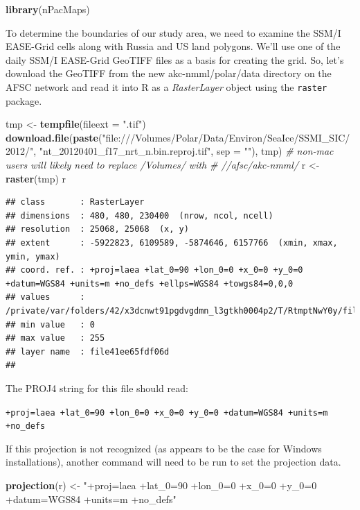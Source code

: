 \documentclass[]{article}
\newenvironment{Shaded}{}{}
\newcommand{\KeywordTok}[1]{\textcolor[rgb]{0.00,0.44,0.13}{\textbf{{#1}}}}
\newcommand{\DataTypeTok}[1]{\textcolor[rgb]{0.56,0.13,0.00}{{#1}}}
\newcommand{\StringTok}[1]{\textcolor[rgb]{0.25,0.44,0.63}{{#1}}}
\newcommand{\CommentTok}[1]{\textcolor[rgb]{0.38,0.63,0.69}{\textit{{#1}}}}
\newcommand{\NormalTok}[1]{{#1}}
\begin{document}
\begin{Shaded}
\begin{Highlighting}[]
\KeywordTok{library}\NormalTok{(nPacMaps)}
\end{Highlighting}
\end{Shaded}
To determine the boundaries of our study area, we need to examine the
SSM/I EASE-Grid cells along with Russia and US land polygons. We'll use
one of the daily SSM/I EASE-Grid GeoTIFF files as a basis for creating
the grid. So, let's download the GeoTIFF from the new
akc-nmml/polar/data directory on the AFSC network and read it into R as
a \emph{RasterLayer} object using the \texttt{raster} package.

\begin{Shaded}
\begin{Highlighting}[]
\NormalTok{tmp <- }\KeywordTok{tempfile}\NormalTok{(}\DataTypeTok{fileext =} \StringTok{".tif"}\NormalTok{)}
\KeywordTok{download.file}\NormalTok{(}\KeywordTok{paste}\NormalTok{(}\StringTok{"file:///Volumes/Polar/Data/Environ/SeaIce/SSMI_SIC/2012/"}\NormalTok{, }
    \StringTok{"nt_20120401_f17_nrt_n.bin.reproj.tif"}\NormalTok{, }\DataTypeTok{sep =} \StringTok{""}\NormalTok{), tmp)}
\CommentTok{# non-mac users will likely need to replace /Volumes/ with}
\CommentTok{# //afsc/akc-nmml/}
\NormalTok{r <- }\KeywordTok{raster}\NormalTok{(tmp)}
\NormalTok{r}
\end{Highlighting}
\end{Shaded}
\begin{verbatim}
## class       : RasterLayer 
## dimensions  : 480, 480, 230400  (nrow, ncol, ncell)
## resolution  : 25068, 25068  (x, y)
## extent      : -5922823, 6109589, -5874646, 6157766  (xmin, xmax, ymin, ymax)
## coord. ref. : +proj=laea +lat_0=90 +lon_0=0 +x_0=0 +y_0=0 +datum=WGS84 +units=m +no_defs +ellps=WGS84 +towgs84=0,0,0 
## values      : /private/var/folders/42/x3dcnwt91pgdvgdmn_l3gtkh0004p2/T/RtmptNwY0y/file41ee65fdf06d.tif 
## min value   : 0 
## max value   : 255 
## layer name  : file41ee65fdf06d 
## 
\end{verbatim}

The PROJ4 string for this file should read:

\texttt{+proj=laea +lat\_0=90 +lon\_0=0 +x\_0=0 +y\_0=0 +datum=WGS84 +units=m +no\_defs}

If this projection is not recognized (as appears to be the case for
Windows installations), another command will need to be run to set the
projection data.

\begin{Shaded}
\begin{Highlighting}[]
\KeywordTok{projection}\NormalTok{(r) <- }\StringTok{"+proj=laea +lat_0=90 +lon_0=0 +x_0=0 +y_0=0 +datum=WGS84 +units=m +no_defs"}
\end{Highlighting}
\end{Shaded}
\end{document}
